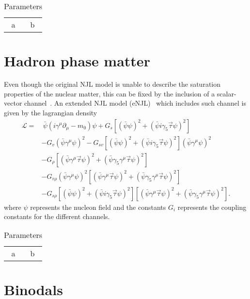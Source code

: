 \documentclass[plainsections,alongposter]{sciposterlocal}
\begin{document}
\begin{multicols}{2}
\begin{table}
\caption{Parameters}
\begin{tabular}{cc}
a & b \\
\end{tabular}
\end{table}

\section*{Hadron phase matter}

Even though the original NJL model is unable to describe the saturation properties of the nuclear matter, this can be fixed by the inclusion of a scalar-vector channel~\cite{Koch1987}. An extended NJL model (eNJL)~\cite{Pais2016} which includes such channel is given by the lagrangian density
\begin{equation*}\label{Eq:Lagrangiana_eNLJ_Pais}
\begin{split}
	\mathcal{L} =&~ \bar{\psi}(i\gamma^\mu\partial_\mu - m_0)\psi + G_s[(\bar{\psi}\psi)^2 + (\bar{\psi}i\gamma_5\vec{\tau}\psi)^2] \\
	& - G_v(\bar{\psi}\gamma^\mu\psi)^2 - G_{sv}[(\bar{\psi}\psi)^2 + (\bar{\psi}i\gamma_5\vec{\tau}\psi)^2](\bar{\psi}\gamma^\mu\psi)^2 \\
	& - G_\rho[(\bar{\psi}\gamma^\mu\vec{\tau}\psi)^2 + (\bar{\psi}\gamma_5\gamma^\mu\vec{\tau}\psi)^2] \\
	& - G_{v\rho}(\bar{\psi}\gamma^\mu\psi)^2[(\bar{\psi}\gamma^\mu\vec{\tau}\psi)^2 + (\bar{\psi}\gamma_5\gamma^\mu\vec{\tau}\psi)^2] \\
	& - G_{s\rho} [(\bar{\psi}\psi)^2 + (\bar{\psi}i\gamma_5\vec{\tau}\psi)^2][(\bar{\psi}\gamma^\mu\vec{\tau}\psi)^2 + (\bar{\psi}\gamma_5\gamma^\mu\vec{\tau}\psi)^2].
\end{split}
\end{equation*}
%
where $\psi$ represents the nucleon field and the constants $G_i$ represents the coupling constants for the different channels.

\begin{table}
\caption{Parameters}
\begin{tabular}{cc}
a & b \\
\end{tabular}
\end{table}

\columnbreak

\section*{Binodals}


\end{multicols}
\end{document}
